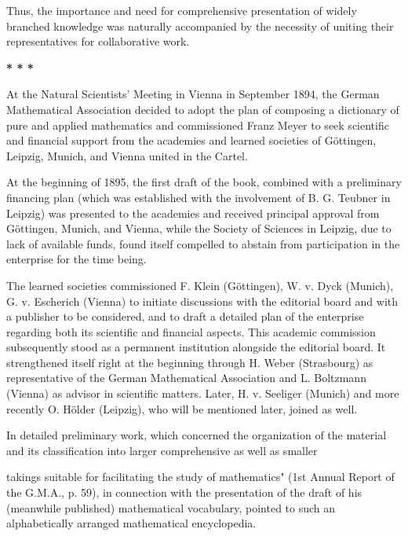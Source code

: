 \thispagestyle{fancy}

\vspace{0.5cm}

Thus, the importance and need for comprehensive presentation of widely branched knowledge was naturally accompanied by the necessity of uniting their representatives for collaborative work.

\centerline{\textbf{* * *}}

At the Natural Scientists' Meeting in Vienna in September 1894, the German Mathematical Association decided to adopt the plan of composing a dictionary of pure and applied mathematics and commissioned Franz Meyer to seek scientific and financial support from the academies and learned societies of Göttingen, Leipzig, Munich, and Vienna united in the Cartel.

At the beginning of 1895, the first draft of the book, combined with a preliminary financing plan (which was established with the involvement of B. G. Teubner in Leipzig) was presented to the academies and received principal approval from Göttingen, Munich, and Vienna, while the Society of Sciences in Leipzig, due to lack of available funds, found itself compelled to abstain from participation in the enterprise for the time being.

The learned societies commissioned F. Klein (Göttingen), W. v. Dyck (Munich), G. v. Escherich (Vienna) to initiate discussions with the editorial board and with a publisher to be considered, and to draft a detailed plan of the enterprise regarding both its scientific and financial aspects. This academic commission subsequently stood as a permanent institution alongside the editorial board. It strengthened itself right at the beginning through H. Weber (Strasbourg) as representative of the German Mathematical Association and L. Boltzmann (Vienna) as advisor in scientific matters. Later, H. v. Seeliger (Munich) and more recently O. Hölder (Leipzig), who will be mentioned later, joined as well.

In detailed preliminary work, which concerned the organization of the material and its classification into larger comprehensive as well as smaller

\vfill
\leftline{\rule{2in}{0.4pt}}
\vspace{0.2cm}
{\footnotesize takings suitable for facilitating the study of mathematics" (1st Annual Report of the G.M.A., p. 59), in connection with the presentation of the draft of his (meanwhile published) mathematical vocabulary, pointed to such an alphabetically arranged mathematical encyclopedia.}
